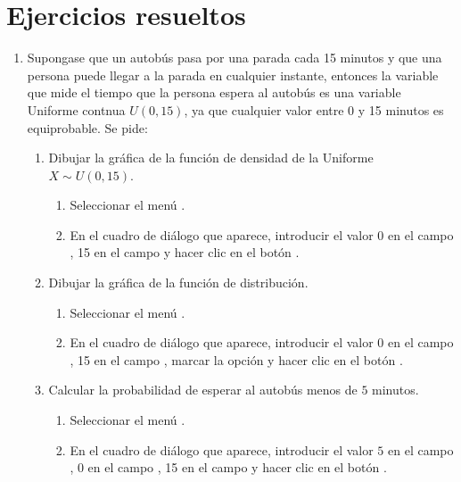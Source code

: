 
\section{Ejercicios resueltos}
\begin{enumerate}[leftmargin=*]
\item Supongase que un autobús pasa por una parada cada 15 minutos y que una persona puede llegar a la parada en
cualquier instante, entonces la variable que mide el tiempo que la persona espera al autobús es una variable Uniforme
contnua $U(0,15)$, ya que cualquier valor entre 0 y 15 minutos es equiprobable.
Se pide:
\begin{enumerate}
\item Dibujar la gráfica de la función de densidad de la Uniforme $X\sim U(0,15)$. 
\begin{indicacion}{
\begin{enumerate}
\item Seleccionar el menú .
\item En el cuadro de diálogo que aparece, introducir el valor 0 en el campo , 15 en el campo
 y hacer clic en el botón .
\end{enumerate}}
\end{indicacion}

\item Dibujar la gráfica de la función de distribución. 
\begin{indicacion}{
\begin{enumerate}
\item Seleccionar el menú .
\item En el cuadro de diálogo que aparece, introducir el valor 0 en el campo , 15 en el campo
, marcar la opción  y hacer clic en el botón .
\end{enumerate}}\end{indicacion}

\item Calcular la probabilidad de esperar al autobús menos de $5$ minutos.
\begin{indicacion}{
\begin{enumerate}
\item Seleccionar el menú .
\item En el cuadro de diálogo que aparece, introducir el valor $5$ en el campo , 0 en
el campo , 15 en el campo  y hacer clic en el botón .
\end{enumerate}}
\end{indicacion}


\end{enumerate}
\end{enumerate}
